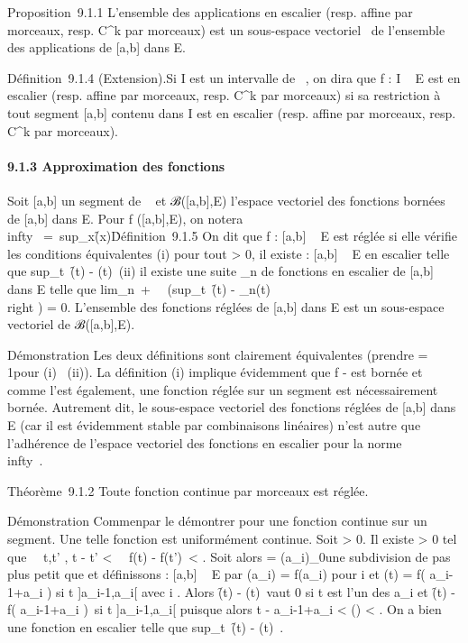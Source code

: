 \documentclass[]{article}
\begin{document}
Proposition~9.1.1 L'ensemble des applications en escalier (resp. affine
par morceaux, resp. C^k par morceaux) est un sous-espace
vectoriel ~de l'ensemble des applications de [a,b] dans E.

Définition~9.1.4 (Extension).Si I est un intervalle de ~, on dira que f
: I \rightarrow~ E est en escalier (resp. affine par morceaux, resp. C^k
par morceaux) si sa restriction à tout segment [a,b] contenu dans I
est en escalier (resp. affine par morceaux, resp. C^k par
morceaux).

\paragraph{9.1.3 Approximation des fonctions}

Soit [a,b] un segment de ~ et ℬ([a,b],E) l'espace vectoriel des
fonctions bornées de [a,b] dans E. Pour f ([a,b],E), on notera
\f\\infty~
=\
sup_x\in[a,b]\f(x)\.

Définition~9.1.5 On dit que f : [a,b] \rightarrow~ E est réglée si elle vérifie
les conditions équivalentes (i) pour tout \epsilon > 0, il existe
\phi : [a,b] \rightarrow~ E en escalier telle que
sup_t\in[a,b]~\f(t)
- \phi(t)\ \leq \epsilon (ii) il existe une suite
\phi_n de fonctions en escalier de [a,b] dans E telle que
lim_n\rightarrow~+\infty~~\left
(sup_t\in[a,b]~\f(t)
- \phi_n(t)\\right ) = 0.
L'ensemble des fonctions réglées de [a,b] dans E est un sous-espace
vectoriel de ℬ([a,b],E).

Démonstration Les deux définitions sont clairement équivalentes (prendre
\epsilon = 1\diagupn pour (i) \rigtharrow~(ii)). La définition (i) implique évidemment que f - \phi
est bornée et comme \phi l'est également, une fonction réglée sur un
segment est nécessairement bornée. Autrement dit, le sous-espace
vectoriel des fonctions réglées de [a,b] dans E (car il est
évidemment stable par combinaisons linéaires) n'est autre que
l'adhérence de l'espace vectoriel des fonctions en escalier pour la
norme \.\\infty~.

Théorème~9.1.2 Toute fonction continue par morceaux est réglée.

Démonstration Commen\ccons par le démontrer pour une
fonction continue sur un segment. Une telle fonction est uniformément
continue. Soit \epsilon > 0. Il existe \eta > 0 tel que
\forall~~t,t' \in [a,b], t - t'
< \eta \rigtharrow~\ f(t) -
f(t')\ < \epsilon. Soit alors \sigma =
(a_i)_0\leqi\leqn une subdivision de pas plus petit que \eta et
définissons \phi : [a,b] \rightarrow~ E par \phi(a_i) = f(a_i) pour
i \in [0,n] et \phi(t) = f( a_i-1+a_i
 ) si t \in]a_i-1,a_i[ avec
i \in [1,n]. Alors \f(t) -
\phi(t)\ vaut 0 si t est l'un des a_i et
\f(t) - f( a_i-1+a_i
 )\ \leq \epsilon si t
\in]a_i-1,a_i[ puisque alors t -
a_i-1+a_i  
< \delta(\sigma) < \eta. On a bien une fonction \phi en escalier
telle que
sup_t\in[a,b]~\f(t)
- \phi(t)\ \leq \epsilon.
\end{document}
